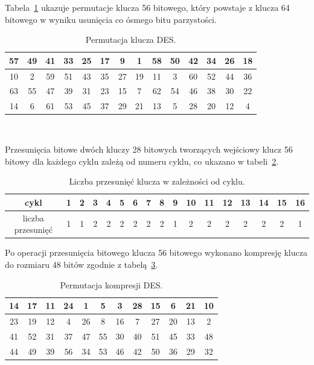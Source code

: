 \documentclass[12p]{article}
\begin{document}
Tabela~\ref{per_klucza} ukazuje permutacje klucza 56 bitowego, który powstaje z klucza 64 bitowego w wyniku usunięcia co ósmego bitu parzystości.%

\begin{table}[H]
\centering
\begin{tabular}{|c|c|c|c|c|c|c|c|c|c|c|c|c|c|}
\hline
57 & 49 & 41 & 33 & 25 & 17 & 9 & 1 & 58 & 50 & 42 & 34 & 26 & 18\\
\hline
10 & 2 & 59 & 51 & 43 & 35 & 27 & 19 & 11 & 3 & 60 & 52 & 44 & 36\\
\hline
63 & 55 & 47 & 39 & 31 & 23 & 15 & 7 & 62 & 54 & 46 & 38 & 30 & 22\\
\hline
14 & 6 & 61 & 53 & 45 & 37 & 29 & 21 & 13 & 5 & 28 & 20 & 12 & 4 \\
\hline
\end{tabular}
\caption{Permutacja klucza DES.}~\label{per_klucza}
\end{table}
 
Przesunięcia bitowe dwóch kluczy 28 bitowych tworzących wejściowy klucz 56 bitowy dla każdego cyklu zależą od numeru cyklu, co ukazano w tabeli~\ref{przesuniecie_klucza}.

\begin{table}[H]
\begin{tabular}{|c|c|c|c|c|c|c|c|c|c|c|c|c|c|c|c|c|}
\hline
cykl&1&2&3&4&5&6&7&8&9&10&11&12&13&14&15&16\\
\hline
liczba przesunięć&1&1&2&2&2&2&2&2&1&2&2&2&2&2&2&1\\ \hline
\end{tabular}
\caption{Liczba przesunięć klucza w zależności od cyklu.}\label{przesuniecie_klucza}
\end{table} 
 
Po operacji przesunięcia bitowego klucza 56 bitowego wykonano kompresję klucza do rozmiaru 48 bitów zgodnie z tabelą~\ref{per_kompresji}.
 
\begin{table}[H]
\centering
\begin{tabular}{|c|c|c|c|c|c|c|c|c|c|c|c|}
\hline
14 & 17 & 11 & 24 & 1 & 5 & 3 & 28 & 15 & 6 & 21 & 10\\
\hline
23 & 19 & 12 & 4 & 26 & 8 & 16 & 7 & 27 & 20 & 13 & 2\\
\hline
41 & 52 & 31 & 37 & 47 & 55 & 30 & 40 & 51 & 45 & 33 & 48\\
\hline
44 & 49 & 39 & 56 & 34 & 53 & 46 & 42 & 50 & 36 & 29 & 32\\
\hline
\end{tabular}
\caption{Permutacja kompresji DES.}~\label{per_kompresji}
\end{table}
\end{document}
